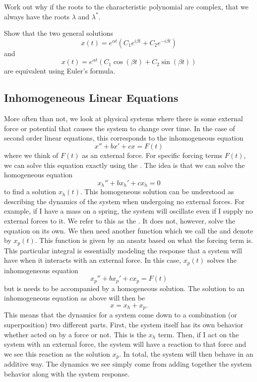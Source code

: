         \begin{exercise}
        Work out why if the roots to the characteristic polynomial are complex, that we always have the roots $\lambda$ and $\lambda^*$.
        \end{exercise}
        
        \begin{exercise}
        Show that the two general solutions
        \[
        x(t)=e^{\alpha t}(C_1 e^{i\beta t}+C_2e^{-i\beta t})
        \]
        and 
        \[
        x(t)=e^{\alpha t}(C_1 \cos(\beta t)+C_2\sin(\beta t))
        \]
        are equivalent using Euler's formula.
        \end{exercise}
        
        \subsection{Inhomogeneous Linear Equations}
        
        More often than not, we look at physical systems where there is some external force or potential that causes the system to change over time.  In the case of second order linear equations, this corresponds to the inhomogeneous equation
        \[
        x''+bx'+cx=F(t)
        \]
        where we think of $F(t)$ as an external force.  For specific forcing terms $F(t)$, we can solve this equation exactly using the .  The idea is that we can solve the homogeneous equation
        \[
        x_h''+bx_h'+cx_h=0
        \]
        to find a solution $x_h(t)$.  This homogeneous solution can be understood as describing the dynamics of the system when undergoing no external forces. For example, if I have a mass on a spring, the system will oscillate even if I supply no external forces to it. We refer to this as the . It does not, however, solve the equation on its own. We then need another function which we call the  and denote by $x_p(t)$. This function is given by an ansatz based on what the forcing term is.  This particular integral is essentially modeling the response that a system will have when it interacts with an external force.  In this case, $x_p(t)$ solves the inhomogeneous equation
        \[
        x_p''+bx_p'+cx_p=F(t)
        \]
        but is needs to be accompanied by a homogeneous solution. The solution to an inhomogeneous equation as above will then be
        \[
        x=x_h+x_p.
        \]
        This means that the dynamics for a system come down to a combination (or superposition) two different parts.  First, the system itself has its own behavior whether acted on by a force or not.  This is the $x_h$ term.  Then, if I act on the system with an external force, the system will have a reaction to that force and we see this reaction as the solution $x_p$.  In total, the system will then behave in an additive way.  The dynamics we see simply come from adding together the system behavior along with the system response.  

